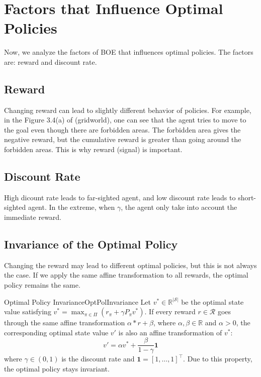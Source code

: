 \section{Factors that Influence Optimal Policies}
    Now, we analyze the factors of BOE that influences optimal policies. The factors are: reward and discount rate.
    \subsection{Reward}
        Changing reward can lead to slightly different behavior of policies. For example, in the Figure 3.4(a) of \cite{Zhao2025} (gridworld), one can see that
        the agent tries to move to the goal even though there are forbidden areas. The forbidden area gives the negative reward, but the cumulative reward is greater than
        going around the forbidden areas. This is why reward (signal) is important.
    \subsection{Discount Rate}
        High dicount rate leads to far-sighted agent, and low discount rate leads to short-sighted agent. In the extreme, when $\gamma$, the agent only
        take into account the immediate reward.
    \subsection{Invariance of the Optimal Policy}
        Changing the reward may lead to different optimal policies, but this is not always the case. If we apply the same affine transformation
        to all rewards, the optimal policy remains the same.
        \begin{thm}{Optimal Policy Invariance}{OptPolInvariance}
            Let $v^* \in \mathbb{R}^{|\mathcal{S}|}$ be the optimal state value satisfying $v^* = \max_{\pi \in \Pi}{(r_\pi + \gamma P_\pi v^*)}$.
            If every reward $r \in \mathcal{R}$ goes through the same affine transformation $\alpha * r + \beta$, where $\alpha, \beta \in \mathbb{R}$ and $\alpha > 0$,
            the corresponding optimal state value $v'$ is also an affine transformation of $v^*$:
            \begin{equation}
                v' = \alpha v^* + \frac{\beta}{1 - \gamma}\textbf{1}
            \end{equation}
            where $\gamma \in (0,1)$ is the discount rate and $\textbf{1} = [1,\dots,1]^\top$.
            Due to this property, the optimal policy stays invariant.
        \end{thm}